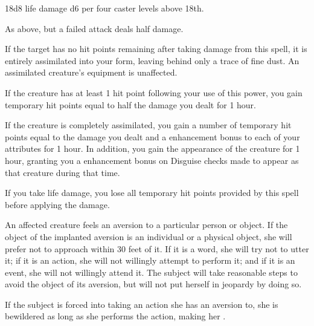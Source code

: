 \spellrng{\rngtouch}
\begin{spellsuccess}
    18d8 life damage \add d6 per four caster levels above 18th. 
\end{spellsuccess}
\begin{spellfailure}
    As above, but a failed attack deals half damage.
\end{spellfailure}
\begin{spelleffect}
    If the target has no hit points remaining after taking damage from this spell, it is entirely assimilated into your form, leaving behind only a trace of fine dust. An assimilated creature's equipment is unaffected.
    \par If the creature has at least 1 hit point following your use of this power, you gain temporary hit points equal to half the damage you dealt for 1 hour.
    \par If the creature is completely assimilated, you gain a number of temporary hit points equal to the damage you dealt and a  enhancement bonus to each of your attributes for 1 hour. In addition, you gain the appearance of the creature for 1 hour, granting you a  enhancement bonus on Disguise checks made to appear as that creature during that time.
\end{spelleffect}
\begin{spellnotes}
    If you take life damage, you lose all temporary hit points provided by this spell before applying the damage.
\end{spellnotes}

\spellrng{\rngmed}
\spelldur{\durext}
\begin{spellsuccess}
  An affected creature feels an aversion to a particular person or object. If the object of the implanted aversion is an individual or a physical object, she will prefer not to approach within 30 feet of it. If it is a word, she will try not to utter it; if it is an action, she will not willingly attempt to perform it; and if it is an event, she will not willingly attend it. The subject will take reasonable steps to avoid the object of its aversion, but will not put herself in jeopardy by doing so.
  \par If the subject is forced into taking an action she has an aversion to, she is bewildered as long as she performs the action, making her \vulnerable.
\end{spellsuccess}

